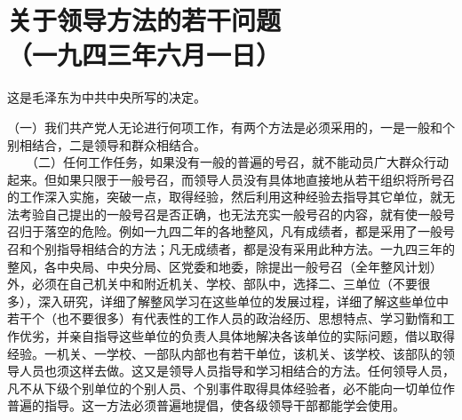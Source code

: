 \documentclass[cn,11pt,chinese]{elegantbook}
\def\myformat#1{\hfil\hfil #1}
\begin{document}
\newpage\section*{\myformat{关于领导方法的若干问题}\\\myformat{（一九四三年六月一日）}}
\begin{introduction}\item  这是毛泽东为中共中央所写的决定。\end{introduction}
（一）我们共产党人无论进行何项工作，有两个方法是必须采用的，一是一般和个别相结合，二是领导和群众相结合。\\
　　（二）任何工作任务，如果没有一般的普遍的号召，就不能动员广大群众行动起来。但如果只限于一般号召，而领导人员没有具体地直接地从若干组织将所号召的工作深入实施，突破一点，取得经验，然后利用这种经验去指导其它单位，就无法考验自己提出的一般号召是否正确，也无法充实一般号召的内容，就有使一般号召归于落空的危险。例如一九四二年的各地整风，凡有成绩者，都是采用了一般号召和个别指导相结合的方法；凡无成绩者，都是没有采用此种方法。一九四三年的整风，各中央局、中央分局、区党委和地委，除提出一般号召（全年整风计划）外，必须在自己机关中和附近机关、学校、部队中，选择二、三单位（不要很多），深入研究，详细了解整风学习在这些单位的发展过程，详细了解这些单位中若干个（也不要很多）有代表性的工作人员的政治经历、思想特点、学习勤惰和工作优劣，并亲自指导这些单位的负责人具体地解决各该单位的实际问题，借以取得经验。一机关、一学校、一部队内部也有若干单位，该机关、该学校、该部队的领导人员也须这样去做。这又是领导人员指导和学习相结合的方法。任何领导人员，凡不从下级个别单位的个别人员、个别事件取得具体经验者，必不能向一切单位作普遍的指导。这一方法必须普遍地提倡，使各级领导干部都能学会使用。\\
\end{document}
